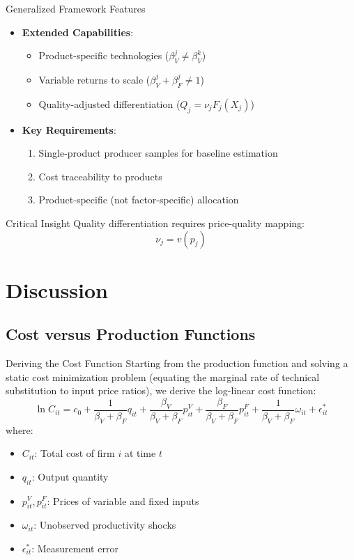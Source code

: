 \documentclass[aspectratio=169]{beamer}  %
\begin{document}
\begin{frame}{Generalized Framework Features}
\begin{itemize}
    \item \textbf{Extended Capabilities}:
    \begin{itemize}
        \item Product-specific technologies (\(\beta_V^j \neq \beta_V^k\))
        \item Variable returns to scale (\(\beta_V^j + \beta_F^j \neq 1\))
        \item Quality-adjusted differentiation (\(Q_j = \nu_j F_j(X_j)\))
    \end{itemize}
    
    \item \textbf{Key Requirements}:
    \begin{enumerate}
        \item Single-product producer samples for baseline estimation
        \item Cost traceability to products
        \item Product-specific (not factor-specific) allocation
    \end{enumerate}
\end{itemize}

\begin{alertblock}{Critical Insight}
Quality differentiation requires price-quality mapping:
\[
\nu_j = v(p_j)
\]
\end{alertblock}
\end{frame}



\section{Discussion}
\subsection{Cost versus Production Functions}
\begin{frame}{Deriving the Cost Function}
Starting from the production function and solving a static cost minimization problem (equating the marginal rate of technical substitution to input price ratios), we derive the log-linear cost function:
\[
\ln C_{it} = c_0 + \frac{1}{\beta_V + \beta_F} q_{it} + \frac{\beta_V}{\beta_V + \beta_F} p^V_{it} + \frac{\beta_F}{\beta_V + \beta_F} p^F_{it} + \frac{1}{\beta_V + \beta_F} \omega_{it} + \epsilon_{it}^* 
\]
where:
\begin{itemize}
    \item \(C_{it}\): Total cost of firm \(i\) at time \(t\)
    \item \(q_{it}\): Output quantity
    \item \(p^V_{it}, p^F_{it}\): Prices of variable and fixed inputs
    \item \(\omega_{it}\): Unobserved productivity shocks
    \item \(\epsilon_{it}^*\): Measurement error
\end{itemize}
\end{frame}
\end{document}
